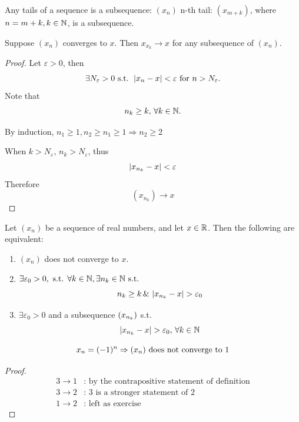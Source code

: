 \documentclass[a4paper,12pt]{article}
\begin{document}
\begin{example}
    Any tails of a sequence is a subsequence:
    \((x_n)\) n-th tail: \((x_{m+k})\), where \(n=m+k,k\in\mathbb{N}\), is a subsequence.\\
\end{example}

\begin{theorem}
    Suppose \((x_n)\) converges to \(x\). Then \(x_{x_k}\rightarrow x\) for any subsequence of \((x_n)\).
\end{theorem}
\begin{proof}
    Let \(\varepsilon > 0\), then 
    \[\exists N_\varepsilon >0 \text{ s.t. } \left\lvert x_n-x\right\rvert < \varepsilon \text{ for }n>N_\varepsilon.\]
    Note that \[n_k \ge k,\,\forall k \in \mathbb{N} .\]
    \begin{exercise}
        By induction, \(n_1\ge 1, n_2 \ge n_1 \ge 1 \Rightarrow n_2 \ge 2\)
    \end{exercise}
    When \(k>N_\varepsilon,\, n_k>N_\varepsilon\), thus
    \[\left\lvert x_{n_k}-x\right\rvert<\varepsilon\]
    Therefore\[(x_{n_k})\rightarrow x\]
\end{proof}

\begin{theorem}
    Let \((x_n)\) be a sequence of real numbers, and let \(x\in \mathbb{R}\). Then the following are equivalent:
    \begin{enumerate}
        \item \((x_n)\) does not converge to \(x\).
        \item \(\exists \varepsilon_0 >0, \text{ s.t. } \forall k \in \mathbb{N}, \exists n_k \in \mathbb{N} \text{ s.t. }\) 
        \[n_k\ge k\, \& \, \left\lvert x_{n_k}-x\right\rvert>\varepsilon_0\]
        \item \(\exists \varepsilon_0 >0 \) and a subsequence \((x_{n_k})\) s.t. \[\left\lvert x_{n_k}-x\right\rvert>\varepsilon_0,\, \forall k \in \mathbb{N}\]
    \end{enumerate}

    \begin{example}
        \[x_n = (-1)^n\Rightarrow(x_{n})\text{ does not converge to 1}\]
    \end{example}

    \begin{proof}
        \begin{align*}
            3\rightarrow1 &\text{: by the contrapositive statement of definition} \\
            3\rightarrow2 &\text{: 3 is a stronger statement of 2} \\
            1\rightarrow2 &\text{: left as exercise}
        \end{align*}
    \end{proof}

\end{theorem}
\end{document}
